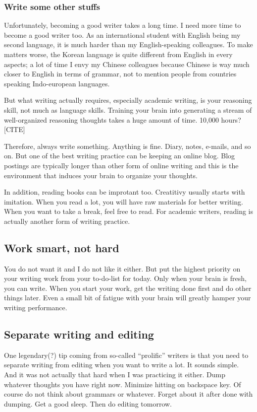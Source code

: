 \documentclass[11pt]{article}
\begin{document}

\subsubsection{Write some other stuffs}
Unfortunately, becoming a good writer takes a long time. I need
more time to become a good writer too. As an international student
with English being my second language, it is much harder than my
English-speaking colleagues. To make matters worse, the Korean
language is quite different from English in every aspects; a lot
of time I envy my Chinese colleagues because Chinese is way much
closer to English in terms of grammar, not to mention people from
countries speaking Indo-european languages.

But what writing actually requires, especially academic writing,
is your reasoning skill, not much as language skills. Training
your brain into generating a stream of well-organized reasoning
thoughts takes a huge amount of time. 10,000 hours? [CITE]

Therefore, always write something. Anything is fine. Diary, notes,
e-mails, and so on. But one of the best writing practice can be
keeping an online blog.  Blog postings are typically longer than
other form of online writing and this is the environment that
induces your brain to organize your thoughts. 

In addition, reading books can be improtant too. Creatitivy
usually starts with imitation. When you read a lot, you will have
raw materials for better writing.  When you want to take a break,
feel free to read. For academic writers, reading is actually
another form of writing practice.

\subsection{Work smart, not hard}

You do not want it and I do not like it either. But put the
highest priority on your writing work from your to-do-list for
today. Only when your brain is fresh, you can write. When you
start your work, get the writing done first and do other things
later. Even a small bit of fatigue with your brain will greatly
hamper your writing performance.

\subsection{Separate writing and editing}
One legendary(?) tip coming from so-called ``prolific'' writers is
that you need to separate writing from editing when you want to write
a lot. It sounds simple. And it was not actually that hard when I
was practicing it either. Dump whatever thoughts you have right now.
Minimize hitting on backspace key. Of course do not think about grammars
or whatever. Forget about it after done with dumping. Get a good sleep.
Then do editing tomorrow.
\end{document}
